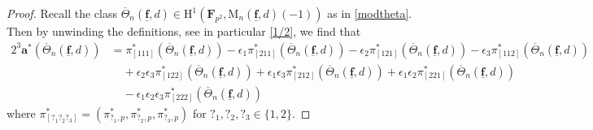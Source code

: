 \documentclass[10pt]{amsart}
\numberwithin{equation}{section}
\theoremstyle{plain}
\numberwithin{equation}{section}
\theoremstyle{definition}
\theoremstyle{remark}
\def\triplef{\underline{\mathbf{f}}}
\def\FF{\mathbf{F}}
\def\rmH{\mathrm{H}}
\def\rmM{\mathrm{M}}
\begin{document}
\begin{proof}
Recall the class $\overline{\Theta}_{n}(\triplef, d)\in \rmH^{1}(\FF_{p^{2}}, \rmM_{n}(\triplef, d)(-1))$ as in \ref{modtheta}. Then by unwinding the definitions, see in particular \ref{1/2},  we find that
\begin{equation*}
\begin{aligned}
2^{3}\mathbf{a}^{\ast}(\overline{\Theta}_{n}(\triplef, d))&=\pi^{\ast}_{[111]}(\overline{\Theta}_{n}(\triplef, d))-\epsilon_{1}\pi^{\ast}_{[211]}(\overline{\Theta}_{n}(\triplef, d))-\epsilon_{2}\pi^{\ast}_{[121]}(\overline{\Theta}_{n}(\triplef, d))-\epsilon_{3}\pi^{\ast}_{[112]}(\overline{\Theta}_{n}(\triplef, d))\\
&\phantom{aa}+\epsilon_{2}\epsilon_{3}\pi^{\ast}_{[122]}(\overline{\Theta}_{n}(\triplef, d))+\epsilon_{1}\epsilon_{3}\pi^{\ast}_{[212]}(\overline{\Theta}_{n}(\triplef, d))+\epsilon_{1}\epsilon_{2}\pi^{\ast}_{[221]}(\overline{\Theta}_{n}(\triplef, d))\\
&\phantom{aa}-\epsilon_{1}\epsilon_{2}\epsilon_{3}\pi^{\ast}_{[222]}(\overline{\Theta}_{n}(\triplef, d))
\end{aligned}
\end{equation*}
where $\pi^{\ast}_{[?_{1}?_{2}?_{3}]}=(\pi^{\ast}_{?_{1},p}, \pi^{\ast}_{?_{2},p}, \pi^{\ast}_{?_{3},p})$ for $?_{1}, ?_{2}, ?_{3}\in\{1, 2\}$. 


\end{proof}
\end{document}
